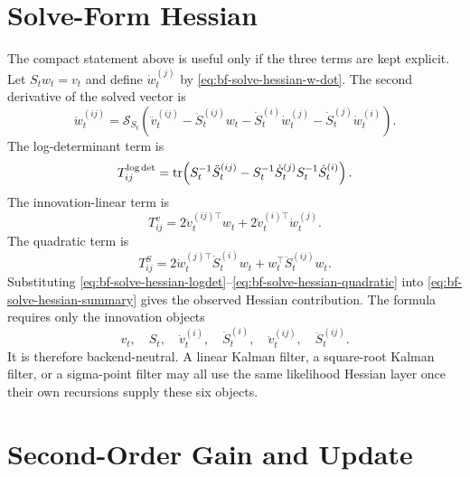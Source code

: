 \section{Solve-Form Hessian}
\label{sec:bf-solve-form-hessian}

The compact statement above is useful only if the three terms are kept explicit.
Let $S_tw_t=v_t$ and define $\dot w_t^{(j)}$ by
\eqref{eq:bf-solve-hessian-w-dot}.  The second derivative of the solved vector is
\begin{equation}
\label{eq:bf-solve-hessian-w-ddot}
  \ddot w_t^{(ij)}
  =
  \mathcal{S}_{S_t}\left(
    \ddot v_t^{(ij)}
    -\ddot S_t^{(ij)}w_t
    -\dot S_t^{(i)}\dot w_t^{(j)}
    -\dot S_t^{(j)}\dot w_t^{(i)}
  \right).
\end{equation}
The log-determinant term is
\begin{equation}
\label{eq:bf-solve-hessian-logdet}
  T_{ij}^{\log\det}
  =
  \operatorname{tr}\!\left(
    S_t^{-1}\ddot S_t^{(ij)}
    -S_t^{-1}\dot S_t^{(j)}S_t^{-1}\dot S_t^{(i)}
  \right).
\end{equation}
The innovation-linear term is
\begin{equation}
\label{eq:bf-solve-hessian-linear}
  T_{ij}^{v}
  =
  2\ddot v_t^{(ij)\top}w_t
  +2\dot v_t^{(i)\top}\dot w_t^{(j)}.
\end{equation}
The quadratic term is
\begin{equation}
\label{eq:bf-solve-hessian-quadratic}
  T_{ij}^{S}
  =
  2\dot w_t^{(j)\top}\dot S_t^{(i)}w_t
  +w_t^\top\ddot S_t^{(ij)}w_t .
\end{equation}
Substituting \eqref{eq:bf-solve-hessian-logdet}--\eqref{eq:bf-solve-hessian-quadratic}
into \eqref{eq:bf-solve-hessian-summary} gives the observed Hessian contribution.
The formula requires only the innovation objects
\[
  v_t,\quad S_t,\quad
  \dot v_t^{(i)},\quad \dot S_t^{(i)},\quad
  \ddot v_t^{(ij)},\quad \ddot S_t^{(ij)}.
\]
It is therefore backend-neutral.  A linear Kalman filter, a square-root Kalman
filter, or a sigma-point filter may all use the same likelihood Hessian layer
once their own recursions supply these six objects.

\section{Second-Order Gain and Update}
\label{sec:bf-hessian-update}


